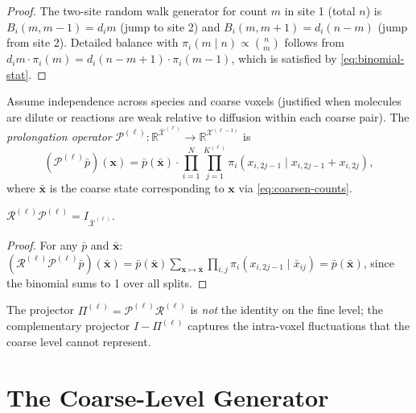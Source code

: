 \documentclass[review,onefignum,onetabnum]{siamart171218}
\newcommand{\bx}{\mathbf{x}}
\newcommand{\R}{\mathbb{R}}
\newcommand{\calX}{\mathcal{X}}
\newcommand{\calR}{\mathcal{R}}
\newcommand{\calP}{\mathcal{P}}
\begin{document}
\begin{proof}
  The two-site random walk generator for count $m$ in site 1
  (total $n$) is
  $B_i(m,m-1) = d_i m$ (jump to site 2) and
  $B_i(m,m+1) = d_i(n-m)$ (jump from site 2).
  Detailed balance with $\pi_i(m \mid n) \propto \binom{n}{m}$
  follows from $d_i m \cdot \pi_i(m) = d_i(n-m+1) \cdot \pi_i(m-1)$,
  which is satisfied by \eqref{eq:binomial-stat}.
\end{proof}

\begin{definition}[Prolongation]
  \label{def:prolongation}
  Assume independence across species and coarse voxels (justified
  when molecules are dilute or reactions are weak relative to
  diffusion within each coarse pair).  The
  \emph{prolongation operator}
  $\calP^{(\ell)} : \R^{\bar{\calX}^{(\ell)}} \to \R^{\calX^{(\ell-1)}}$
  is
  \begin{equation}
    \label{eq:prolongation}
    (\calP^{(\ell)} \bar{p})(\bx)
    = \bar{p}(\bar{\bx}) \cdot
      \prod_{i=1}^{N} \prod_{j=1}^{K^{(\ell)}}
      \pi_i\!\left(x_{i,2j-1} \mid x_{i,2j-1}+x_{i,2j}\right),
  \end{equation}
  where $\bar{\bx}$ is the coarse state corresponding to $\bx$
  via \eqref{eq:coarsen-counts}.
\end{definition}

\begin{proposition}[Consistency]
  \label{prop:consistency}
  $\calR^{(\ell)} \calP^{(\ell)} = I_{\bar{\calX}^{(\ell)}}$.
\end{proposition}

\begin{proof}
  For any $\bar{p}$ and $\bar{\bx}$:
  $(\calR^{(\ell)} \calP^{(\ell)} \bar{p})(\bar{\bx})
   = \bar{p}(\bar{\bx}) \sum_{\bx \mapsto \bar{\bx}}
     \prod_{i,j} \pi_i(x_{i,2j-1} \mid \bar{x}_{ij})
   = \bar{p}(\bar{\bx})$,
  since the binomial sums to 1 over all splits.
\end{proof}

The projector $\Pi^{(\ell)} = \calP^{(\ell)} \calR^{(\ell)}$ is
\emph{not} the identity on the fine level; the complementary
projector $I - \Pi^{(\ell)}$ captures the intra-voxel
fluctuations that the coarse level cannot represent.

\section{The Coarse-Level Generator}
\label{sec:coarse-gen}
\end{document}
